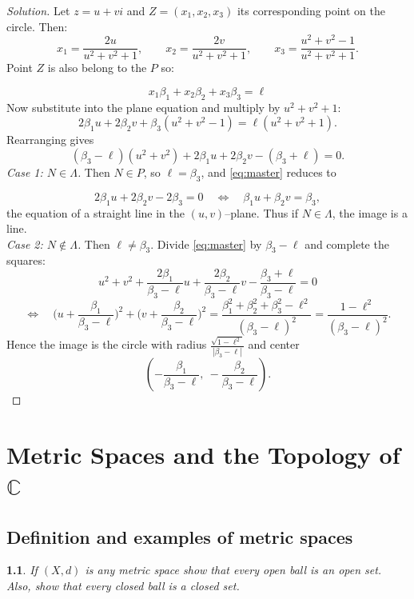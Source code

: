 \documentclass[12pt, a4paper]{report}
\theoremstyle{spaced}
\newtheorem{exercise}{}
\newcommand{\setexercise}[1]{\setcounter{exercise}{#1-1}}
\begin{document}
\begin{proof}[Solution]
	Let \(z=u+vi\) and \(Z=(x_1, x_2, x_3)\) its corresponding point on the circle. Then:
	\[
		x_1=\frac{2u}{u^2+v^2+1},\qquad
		x_2=\frac{2v}{u^2+v^2+1},\qquad
		x_3=\frac{u^2+v^2-1}{u^2+v^2+1}.
	\]
	Point \(Z\) is also belong to the \(P\) so:

	\[
		x_1 \beta_1 + x_2 \beta_2 + x_3 \beta_3 = \ell
	\]
	Now substitute into the plane equation and multiply by $u^2+v^2+1$:
	\[
		2\beta_1u+2\beta_2v+\beta_3(u^2+v^2-1)=\ell(u^2+v^2+1).
	\]
	Rearranging gives
	\begin{equation}\label{eq:master}
		(\beta_3-\ell)(u^2+v^2)+2\beta_1u+2\beta_2v-(\beta_3+\ell)=0.
	\end{equation}
	\emph{Case 1: $N\in\Lambda$.}
	Then $N\in P$, so $\ell=\beta_3$, and \eqref{eq:master} reduces to

	\[
		2\beta_1u+2\beta_2v-2\beta_3=0
		\quad\Longleftrightarrow\quad
		\beta_1u+\beta_2v=\beta_3,
	\]
	the equation of a straight line in the $(u,v)$–plane. Thus if $N\in\Lambda$, the image is a line.\\

	\noindent	\emph{Case 2: $N\notin\Lambda$.}
	Then $\ell\neq\beta_3$. Divide \eqref{eq:master} by $\beta_3-\ell$ and complete the squares:
	\[
		u^2+v^2+\frac{2\beta_1}{\beta_3-\ell}u+\frac{2\beta_2}{\beta_3-\ell}v
		-\frac{\beta_3+\ell}{\beta_3-\ell}=0
	\]
	\[
		\Longleftrightarrow\quad
		\Big(u+\frac{\beta_1}{\beta_3-\ell}\Big)^2+\Big(v+\frac{\beta_2}{\beta_3-\ell}\Big)^2
		=\frac{\beta_1^2+\beta_2^2+\beta_3^2-\ell^2}{(\beta_3-\ell)^2}
		=\frac{1-\ell^2}{(\beta_3-\ell)^2}.
	\]
	Hence the image is the circle with radius \(		\frac{\sqrt{1-\ell^2}}{|\beta_3-\ell|}\) and center
	\[
		\left(-\frac{\beta_1}{\beta_3-\ell},\ -\frac{\beta_2}{\beta_3-\ell}\right).
	\]
\end{proof}

\newpage
\chapter{Metric Spaces and the Topology of $\mathbb{C}$}
\section{Definition and examples of metric spaces}

\setexercise{3}
\begin{exercise}
	If $(X,d)$ is any metric space show that every open ball is an open set.
	Also, show that every closed ball is a closed set.
\end{exercise}
\end{document}
